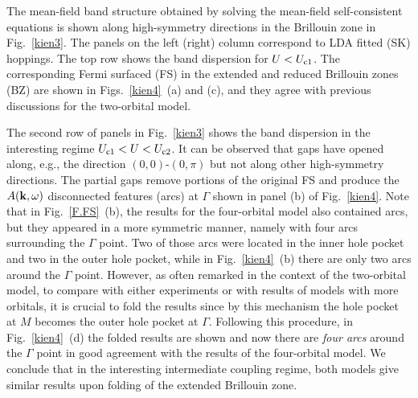 \documentclass[aps,prb,superscriptaddress,preprintnumbers,
showpacs,legalpaper,twoside,twocolumn,amsmath,amssymb]{revtex4}
\begin{document}
The mean-field band structure obtained by solving the mean-field
self-consistent equations is shown along high-symmetry directions in the Brillouin zone
in Fig.~\ref{kien3}. The panels on the left (right) column correspond to LDA fitted
(SK) hoppings.
The top row shows the band dispersion for $U<U_{\rm c1}$. The corresponding Fermi surfaced (FS) in the
extended and reduced Brillouin
zones (BZ) are shown in Figs.~\ref{kien4}~(a) and (c), and they agree with previous discussions
for the two-orbital model.\cite{daghofer}



The second row of panels in
Fig.~\ref{kien3} shows the band dispersion in the interesting regime
$U_{\rm c1}<U<U_{\rm c2}$. It can be observed that gaps have opened
along, e.g., the direction $(0,0)$-$(0,\pi)$ but not along
other high-symmetry directions. The partial gaps remove portions
of the original FS and
produce the $A({\bf k},\omega)$ disconnected features (arcs) at $\Gamma$
shown in panel (b) of Fig.~\ref{kien4}.
Note that in Fig.~\ref{F.FS}~(b), the results for the four-orbital
model also contained arcs, but they appeared in a more symmetric manner, namely with four arcs surrounding
the $\Gamma$ point. Two of those arcs were located in the inner hole pocket and two in the outer hole
pocket, while in Fig.~\ref{kien4}~(b) there are only two arcs around the $\Gamma$ point. However, as
often remarked in the context of the two-orbital model, to compare with either experiments or with results
of models with more orbitals, it is crucial to fold the results since by this mechanism the hole pocket
at $M$ becomes the outer hole pocket at $\Gamma$. Following this procedure,
in Fig.~\ref{kien4}~(d) the folded results
are shown and now there are {\it four arcs} around the $\Gamma$ point in good agreement with the
results of the four-orbital model. We conclude that in the interesting intermediate coupling regime,
both models give similar results upon folding of the extended Brillouin zone.
\end{document}
